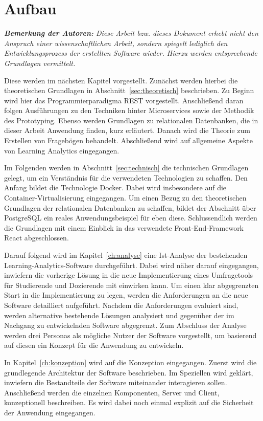 \section{Aufbau}

\textit{\textbf{Bemerkung der Autoren:}
Diese Arbeit bzw. dieses Dokument erhebt nicht den Anspruch einer wissenschaftlichen Arbeit, sondern spiegelt lediglich den Entwicklungsprozess der erstellten Software wieder. 
Hierzu werden entsprechende Grundlagen vermittelt.}

Diese werden im nächsten Kapitel vorgestellt.
Zunächst werden hierbei die theoretischen Grundlagen in Abschnitt~\vref{sec:theoretisch} beschrieben.
Zu Beginn wird hier das Programmierparadigma \acs{REST} vorgestellt.
Anschließend daran folgen Ausführungen zu den Techniken hinter Microservices sowie der Methodik des Prototyping.
Ebenso werden Grundlagen zu relationalen Datenbanken, die in dieser Arbeit Anwendung finden, kurz erläutert.
Danach wird die Theorie zum Erstellen von Fragebögen behandelt.
Abschließend wird auf allgemeine Aspekte von Learning Analytics eingegangen. 

Im Folgenden werden in Abschnitt~\vref{sec:technisch} die technischen Grundlagen gelegt, um ein Verständnis für die verwendeten Technologien zu schaffen. 
Den Anfang bildet die Technologie Docker.
Dabei wird insbesondere auf die Container-Virtualisierung eingegangen.
Um einen Bezug zu den theoretischen Grundlagen der relationalen Datenbanken zu schaffen, bildet der Abschnitt über PostgreSQL ein reales Anwendungsbeispiel für eben diese.
Schlussendlich werden die Grundlagen mit einem Einblick in das verwendete Front-End-Framework React abgeschlossen. 

Darauf folgend wird im Kapitel~\vref{ch:analyse} eine Ist-Analyse der bestehenden Learning-Analytics-Software durchgeführt. 
Dabei wird näher darauf eingegangen, inwiefern die vorherige Lösung in die neue Implementierung eines Umfragetools für Studierende und Dozierende mit einwirken kann.
Um einen klar abgegrenzten Start in die Implementierung zu legen, werden die Anforderungen an die neue Software detailliert aufgeführt. 
Nachdem die Anforderungen evaluiert sind, werden alternative bestehende Lösungen analysiert und gegenüber der im Nachgang zu entwickelnden Software abgegrenzt.
Zum Abschluss der Analyse werden drei Personas als mögliche Nutzer der Software vorgestellt, um basierend auf diesen ein Konzept für die Anwendung zu entwickeln.

In Kapitel~\vref{ch:konzeption} wird auf die Konzeption eingegangen. 
Zuerst wird die grundlegende Architektur der Software beschrieben.
Im Speziellen wird geklärt, inwiefern die Bestandteile der Software miteinander interagieren sollen.
Anschließend werden die einzelnen Komponenten, Server und Client, konzeptionell beschreiben.
Es wird dabei noch einmal explizit auf die Sicherheit der Anwendung eingegangen.

